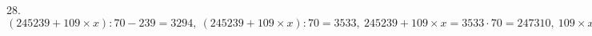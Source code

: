 28. $(245239+109\times x):70-239=3294,\ (245239+109\times x):70=3533,\ 245239+109\times x=3533\cdot70=247310,\ 109\times x=2071,\ x=2071:109=19.$\\
